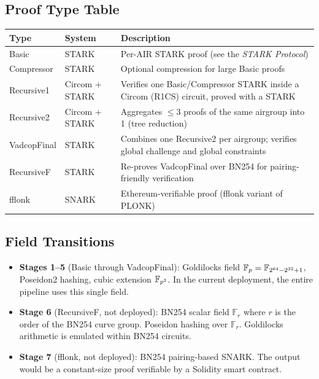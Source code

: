 \subsection{Proof Type Table}
\label{sec:proof-types}

\begin{center}
\renewcommand{\arraystretch}{1.3}
\begin{tabular}{@{}llp{}@{}}
  \toprule
  Type & System & Description \\
  \midrule
  Basic & STARK & Per-AIR STARK proof
    (see the \emph{STARK Protocol}) \\
  Compressor & STARK & Optional compression for large Basic proofs \\
  Recursive1 & Circom + STARK & Verifies one Basic/Compressor STARK
                                inside a Circom (R1CS) circuit, proved with a STARK \\
  Recursive2 & Circom + STARK & Aggregates $\leq 3$ proofs of the same airgroup
                                into 1 (tree reduction) \\
  VadcopFinal & STARK & Combines one Recursive2 per airgroup;
                          verifies global challenge and global constraints \\
  RecursiveF & STARK & Re-proves VadcopFinal over BN254 for pairing-friendly verification \\
  fflonk & SNARK & Ethereum-verifiable proof (fflonk variant of PLONK) \\
  \bottomrule
\end{tabular}
\end{center}

\subsection{Field Transitions}
\label{sec:field-transitions}

\begin{itemize}[nosep]
  \item \textbf{Stages 1--5} (Basic through VadcopFinal):
        Goldilocks field $\mathbb{F}_p = \mathbb{F}_{2^{64} - 2^{32} + 1}$,
        Poseidon2 hashing, cubic extension $\mathbb{F}_{p^3}$.
        In the current deployment, the entire pipeline uses this single field.
  \item \textbf{Stage 6} (RecursiveF, not deployed):
        BN254 scalar field $\mathbb{F}_r$ where
        $r$ is the order of the BN254 curve group.
        Poseidon hashing over $\mathbb{F}_r$.
        Goldilocks arithmetic is emulated within BN254 circuits.
  \item \textbf{Stage 7} (fflonk, not deployed):
        BN254 pairing-based SNARK.
        The output would be a constant-size proof verifiable by
        a Solidity smart contract.
\end{itemize}

